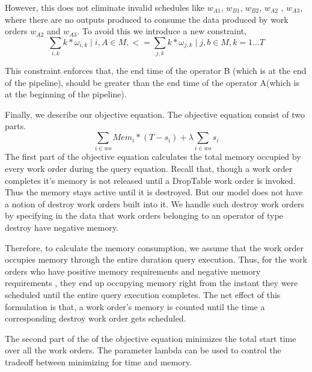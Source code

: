 \documentclass[20pt]{sigchi}
\begin{document}
However, this does not eliminate invalid  schedules like $w_{A1}$, $w_{B1}$, $w_{B2}$, $w_{A2}$ , $w_{A3}$, where there are no outputs produced to consume the data produced by  work orders $w_{A2}$  and $w_{A3}$. To avoid this we introduce a new constraint,
\begin{equation}
\label{eqn:7}
\sum\limits_{i,k} k  * \omega_{i,k}  \mid i,A \in M ,
<=
\sum\limits_{j,k} k  * \omega_{j,k}  \mid j,b \in M ,  k = 1 \hdots T
\end{equation} 

This constraint enforces that, the end time of the operator B (which is at the end of the pipeline), should be greater than  the end time of the operator A(which is at the beginning of the pipeline). 

Finally, we describe our objective equation. The objective equation consist of  two parts.
\begin{equation}
\label{eqn:8}
\sum \limits_{i \in wo} Mem_{i} * (T - s_{i}) +  \lambda \sum  \limits_{i \in wo} s_{i}
\end{equation} 
The first part of the objective equation calculates the total memory occupied by every work order during the query equation.
Recall that, though a work order completes it's memory is not released until a DropTable work order is invoked. Thus the memory stays active until it is destroyed. But our model does not have a notion of destroy work orders built into it. We handle such destroy work orders by specifying in the data that work orders belonging to an operator of type destroy have negative memory.

Therefore, to calculate the memory consumption,  we assume that the work order occupies memory through the entire duration query execution. Thus, for  the work orders  who have positive memory requirements and negative memory requirements , they end up occupying memory right from the instant they were scheduled until the entire query execution completes. The net effect of this formulation is that, a work order's memory is counted  until the time a corresponding destroy work order gets scheduled.

The second part of the of the objective equation minimizes the total  start time over all the work orders. The parameter lambda  can be used to control the tradeoff between minimizing for time and memory.
\end{document}
